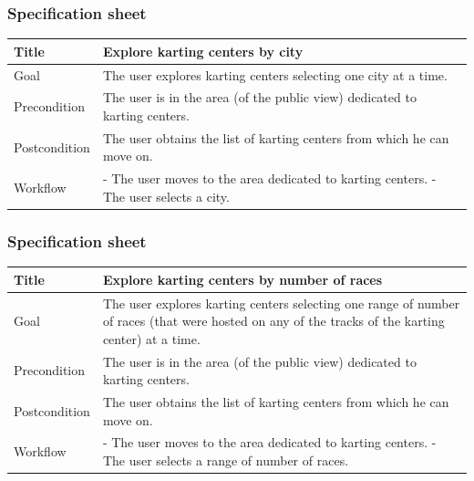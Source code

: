 \documentclass{beamer}
\begin{document}

\begin{frame}
\frametitle{Specification sheet}
\begin{table}
    \tiny
    \begin{tabular}{|p{2cm}|p{6cm}|}
    \hline
    Title & \textbf{Explore karting centers by city} \\
    \hline
    Goal & The user explores karting centers selecting one city at a time. \\
    \hline
    Precondition & The user is in the area (of the public view) dedicated to karting centers.\\
    \hline
    Postcondition & The user obtains the list of karting centers from which he can move on.\\
    \hline
    Workflow &
    - The user moves to the area dedicated to karting centers. \newline
    - The user selects a city. \\
    \hline
    \end{tabular}
\end{table}
\end{frame}

\begin{frame}
    \frametitle{Specification sheet}
    \begin{table}
        \tiny
        \begin{tabular}{|p{2cm}|p{6cm}|}
        \hline
        Title & \textbf{Explore karting centers by number of races} \\
        \hline
        Goal & The user explores karting centers selecting one range of number of races (that
        were hosted on any of the tracks of the karting center) at a time. \\
        \hline
        Precondition & The user is in the area (of the public view) dedicated to karting centers.\\
        \hline
        Postcondition & The user obtains the list of karting centers from which he can move on.\\
        \hline
        Workflow &
        - The user moves to the area dedicated to karting centers. \newline
        - The user selects a range of number of races. \\
        \hline
        \end{tabular}
\end{table}
\end{frame}
\end{document}
